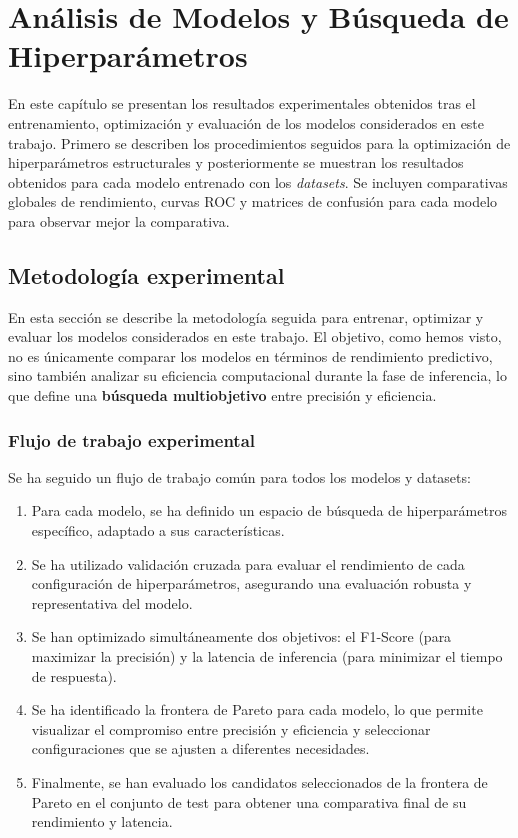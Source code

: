\chapter{Análisis de Modelos y Búsqueda de Hiperparámetros}

En este capítulo se presentan los resultados experimentales obtenidos tras el entrenamiento, optimización y evaluación de los modelos considerados en este trabajo. Primero se describen los procedimientos seguidos para la optimización de hiperparámetros estructurales y posteriormente se muestran los resultados obtenidos para cada modelo entrenado con los \textit{datasets}. Se incluyen comparativas globales de rendimiento, curvas ROC y matrices de confusión para cada modelo para observar mejor la comparativa.

\section{Metodología experimental}

En esta sección se describe la metodología seguida para entrenar, optimizar y evaluar los modelos considerados en este trabajo. El objetivo, como hemos visto, no es únicamente comparar los modelos en términos de rendimiento predictivo, sino también analizar su eficiencia computacional durante la fase de inferencia, lo que define una \textbf{búsqueda multiobjetivo} entre precisión y eficiencia.

\subsection{Flujo de trabajo experimental}

Se ha seguido un flujo de trabajo común para todos los modelos y datasets:

\begin{enumerate}
    \item Para cada modelo, se ha definido un espacio de búsqueda de hiperparámetros específico, adaptado a sus características.
    \item Se ha utilizado validación cruzada para evaluar el rendimiento de cada configuración de hiperparámetros, asegurando una evaluación robusta y representativa del modelo.
    \item Se han optimizado simultáneamente dos objetivos: el F1-Score (para maximizar la precisión) y la latencia de inferencia (para minimizar el tiempo de respuesta).
    \item Se ha identificado la frontera de Pareto para cada modelo, lo que permite visualizar el compromiso entre precisión y eficiencia y seleccionar configuraciones que se ajusten a diferentes necesidades.
    \item Finalmente, se han evaluado los candidatos seleccionados de la frontera de Pareto en el conjunto de test para obtener una comparativa final de su rendimiento y latencia.
\end{enumerate}

